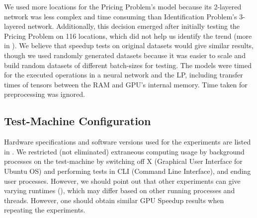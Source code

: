 \documentclass[12pt]{article}
\begin{document}
    We used more locations for the Pricing Problem's model because its 2-layered network was less complex and time consuming than Identification Problem's 3-layered network. Additionally, this decision emerged after initially testing the Pricing Problem on 116 locations, which did not help us identify the trend (more in ). We believe that speedup tests on original datasets would give similar results, though we used randomly generated datasets because it was easier to scale and build random datasets of different batch-sizes for testing. The models were timed for the executed operations in a neural network and the LP, including transfer times of tensors between the RAM and GPU's internal memory. Time taken for preprocessing was ignored. 
    
    \subsection{Test-Machine Configuration} \label{sec:Test-Machine Configuration}
    Hardware specifications and software versions used for the experiments are listed in . We restricted (not eliminated) extraneous computing usage by background processes on the test-machine by switching off X (Graphical User Interface for Ubuntu OS) and performing tests in CLI (Command Line Interface), and ending user processes. However, we should point out that other experiments can give varying runtimes (), which may differ based on other running processes and threads. However, one should obtain similar GPU Speedup results when repeating the experiments.
\end{document}
